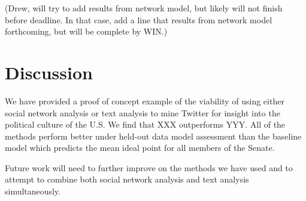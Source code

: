 \documentclass[10pt]{article}
\begin{document}
(Drew, will try to add results from network model, but likely will not finish before deadline.  In that case, add a line that results from network model forthcoming, but will be complete by WIN.)

\section{Discussion}
We have provided a proof of concept example of the viability of using either social network analysis or text analysis to mine Twitter for insight into the political culture of the U.S. We find that XXX outperforms YYY. All of the methods perform better under held-out data model assessment than the baseline model which predicts the mean ideal point for all members of the Senate.

Future work will need to further improve on the methods we have used and to attempt to combine both social network analysis and text analysis simultaneously.


\newpage
{}
 
\end{document}
